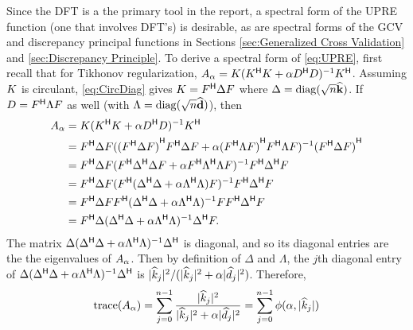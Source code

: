 Since the DFT is a the primary tool in the report, a spectral form of the UPRE function (one that involves DFT's) is desirable, as are spectral forms of the GCV and discrepancy principal functions in Sections \ref{sec:Generalized Cross Validation} and \ref{sec:Discrepancy Principle}. To derive a spectral form of \eqref{eq:UPRE}, first recall that for Tikhonov regularization, $A_{\alpha} = K({K}^\mathsf{H}K + \alpha{D}^\mathsf{H}D)^{-1}{K}^\mathsf{H}$. Assuming $K$ is circulant, \eqref{eq:CircDiag} gives $K = {F}^\mathsf{H}\Delta{F}$ where $\Delta = \operatorname{diag}(\sqrt{n}\widehat{\mathbf{k}})$. If $D = {F}^\mathsf{H}\Lambda{F}$ as well (with $\Lambda = \operatorname{diag}(\sqrt{n}\widehat{\mathbf{d}})$), then
\begin{align*}
A_{\alpha} &= K({K}^\mathsf{H}K + \alpha{{D}^\mathsf{H}}D)^{-1}{K}^\mathsf{H} \\
&= {F}^\mathsf{H}\Delta{F}({({F}^\mathsf{H}\Delta{F})}^\mathsf{H} {F}^\mathsf{H}\Delta{F} + \alpha{({F}^\mathsf{H}\Lambda{F})}^\mathsf{H} {F}^\mathsf{H}\Lambda{F})^{-1}{({F}^\mathsf{H}\Delta{F})}^\mathsf{H} \\
&= {F}^\mathsf{H}\Delta{F}({F}^\mathsf{H}{\Delta}^\mathsf{H}\Delta{F} + \alpha{{F}^\mathsf{H}{\Lambda}^\mathsf{H}\Lambda{F}})^{-1}{F}^\mathsf{H}{\Delta}^\mathsf{H}{F} \\
&= {F}^\mathsf{H}\Delta{F}({F}^\mathsf{H}({\Delta}^\mathsf{H}\Delta + \alpha{\Lambda}^\mathsf{H}\Lambda)F)^{-1}{F}^\mathsf{H}{\Delta}^\mathsf{H}{F} \\
&= {F}^\mathsf{H}\Delta{F}{F}^\mathsf{H}({\Delta}^\mathsf{H}\Delta + \alpha{\Lambda}^\mathsf{H}\Lambda)^{-1}F{F}^\mathsf{H}{\Delta}^\mathsf{H}{F} \\
&= {F}^\mathsf{H}\Delta({\Delta}^\mathsf{H}\Delta + \alpha{\Lambda}^\mathsf{H}\Lambda)^{-1}{\Delta}^\mathsf{H}{F}.
\end{align*}
The matrix $\Delta({\Delta}^\mathsf{H}\Delta + \alpha{\Lambda}^\mathsf{H}\Lambda)^{-1}{\Delta}^\mathsf{H}$ is diagonal, and so its diagonal entries are the the eigenvalues of $A_{\alpha}$. Then by definition of $\Delta$ and $\Lambda$, the $j$th diagonal entry of $\Delta({\Delta}^\mathsf{H}\Delta + \alpha{\Lambda}^\mathsf{H}\Lambda)^{-1}{\Delta}^\mathsf{H}$ is $|\widehat{k}_j|^2/(|\widehat{k}_j|^2 + \alpha|\widehat{d}_j|^2)$. Therefore,
\begin{equation}
\operatorname{trace}(A_{\alpha}) = \sum_{j = 0}^{n-1} \frac{|\widehat{k}_j|^2}{|\widehat{k}_j|^2 + \alpha|\widehat{d}_j|^2} = \sum_{j = 0}^{n-1} \phi(\alpha,|\widehat{k}_j|)
\label{eq:TraceUPRE}
\end{equation}
